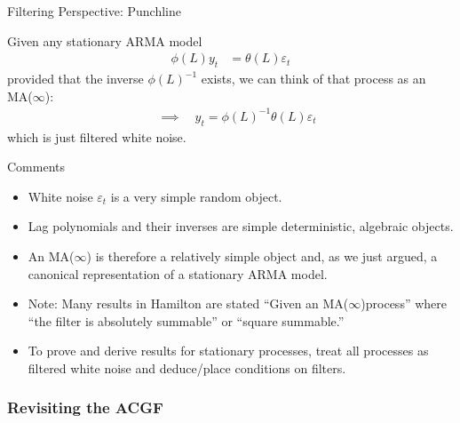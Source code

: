 \documentclass[aspectratio=169, handout]{beamer}
\begin{document}
{\footnotesize
\begin{frame}{Filtering Perspective: Punchline}

Given any stationary ARMA model
\begin{align*}
  \phi(L)y_t &= \theta(L)\varepsilon_t
\end{align*}
provided that the inverse $\phi(L)^{-1}$ exists, we can think of that
process as an \alert{MA($\infty$)}:
\begin{align*}
  \quad\implies\quad
  y_t = \phi(L)^{-1}\theta(L)\varepsilon_t
\end{align*}
which is just filtered white noise.

Comments
\begin{itemize}
  \item White noise $\varepsilon_t$ is a very simple \alert{random}
    object.
  \item Lag polynomials and their inverses are simple
    \alert{deterministic, algebraic} objects.
  \item An MA($\infty$) is therefore a relatively simple object and, as
    we just argued, a canonical representation of a stationary ARMA
    model.
  \item \alert{Note}: Many results in Hamilton are stated ``Given an
    MA($\infty$)process'' where ``the filter is absolutely summable'' or
    ``square summable.''
  \item
    To prove and derive results for stationary processes, treat
    \alert{all} processes as filtered white noise and deduce/place
    conditions on filters.
\end{itemize}
\end{frame}
}


\subsubsection{Revisiting the ACGF}
\end{document}
